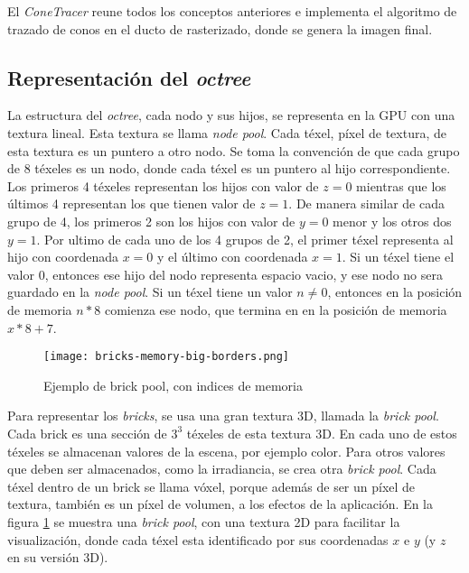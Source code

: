 El \textit{ConeTracer} reune todos los conceptos anteriores e implementa el algoritmo de trazado de conos en el ducto de rasterizado, donde se genera la imagen final.

\subsection{Representación del \textit{octree}}

La estructura del \textit{octree}, cada nodo y sus hijos, se representa en la GPU con una textura lineal.
Esta textura se llama \textit{node pool}.
Cada téxel, píxel de textura, de esta textura es un puntero a otro nodo.
Se toma la convención de que cada grupo de 8 téxeles es un nodo, donde cada téxel es un puntero al hijo correspondiente.
Los primeros 4 téxeles representan los hijos con valor de $z = 0$ mientras que los últimos 4 representan los que tienen valor de $z = 1$.
De manera similar de cada grupo de 4, los primeros 2 son los hijos con valor de $y = 0$ menor y los otros dos $y = 1$.
Por ultimo de cada uno de los 4 grupos de 2, el primer téxel representa al hijo con coordenada $x = 0$ y el último con coordenada $x = 1$.
Si un téxel tiene el valor $0$, entonces ese hijo del nodo representa espacio vacio, y ese nodo no sera guardado en la \textit{node pool}.
Si un téxel tiene un valor $n \not = 0$, entonces en la posición de memoria $n * 8$ comienza ese nodo, que termina en en la posición de memoria $x * 8 + 7$.

\begin{figure}[h!]
    \centering
    \texttt{[image: bricks-memory-big-borders.png]}
    \caption{Ejemplo de brick pool, con indices de memoria}
    \label{fig:brick_pool_example}
\end{figure}

Para representar los \textit{bricks}, se usa una gran textura 3D, llamada la \textit{brick pool}.
Cada brick es una sección de $3^3$ téxeles de esta textura 3D.
En cada uno de estos téxeles se almacenan valores de la escena, por ejemplo color.
Para otros valores que deben ser almacenados, como la irradiancia, se crea otra \textit{brick pool}.
Cada téxel dentro de un brick se llama vóxel, porque además de ser un píxel de textura, también es un píxel de volumen, a los efectos de la aplicación.
En la figura \ref{fig:brick_pool_example} se muestra una \textit{brick pool}, con una textura 2D para facilitar la visualización, donde cada téxel esta identificado por sus coordenadas $x$ e $y$ (y $z$ en su versión 3D).

